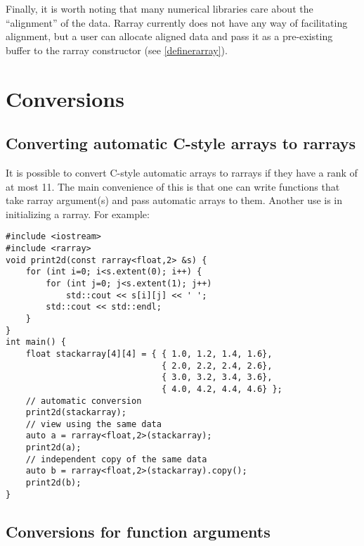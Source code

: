 \documentclass[11pt,twoside]{article}
\begin{document}
Finally, it is worth noting that many numerical libraries care about
the ``alignment'' of the data.  Rarray currently does not have any way of
facilitating alignment, but a user can allocate aligned
data and pass it as a pre-existing buffer to the rarray constructor
(see \ref{definerarray}).

\section{Conversions}

\subsection{Converting automatic C-style arrays to rarrays}

It is possible to convert C-style automatic arrays to rarrays if they
have a rank of at most 11.
The main convenience of this is that one can write functions that take rarray argument(s) and pass automatic arrays to them. Another use is in initializing a rarray. For example:
\vspace{-5pt}\begin{framed}\vspace{-14pt}%
\begin{verbatim}
#include <iostream>
#include <rarray>
void print2d(const rarray<float,2> &s) {
    for (int i=0; i<s.extent(0); i++) {
        for (int j=0; j<s.extent(1); j++)
            std::cout << s[i][j] << ' ';
        std::cout << std::endl;
    }
}
int main() {
    float stackarray[4][4] = { { 1.0, 1.2, 1.4, 1.6},
                               { 2.0, 2.2, 2.4, 2.6},
                               { 3.0, 3.2, 3.4, 3.6},
                               { 4.0, 4.2, 4.4, 4.6} };
    // automatic conversion
    print2d(stackarray);
    // view using the same data
    auto a = rarray<float,2>(stackarray);
    print2d(a);
    // independent copy of the same data
    auto b = rarray<float,2>(stackarray).copy();
    print2d(b);
}
\end{verbatim}%
\vspace{-14pt}\end{framed}\vspace{-8pt}



\subsection{Conversions for function arguments}
\end{document}
